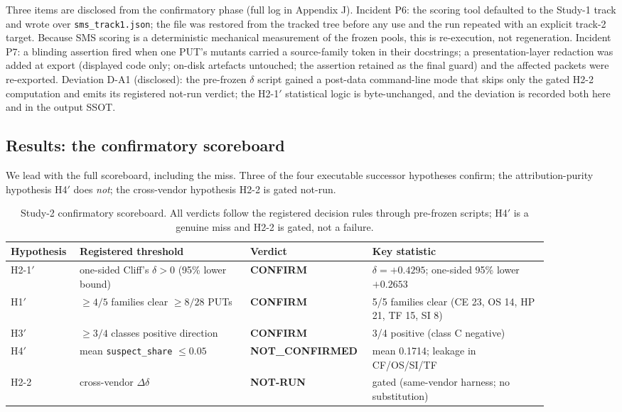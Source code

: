 \documentclass[manuscript,screen,review]{acmart}
\begin{document}
Three items are disclosed from the confirmatory phase (full log in
Appendix J). Incident P6: the scoring
tool defaulted to the Study-1 track and wrote over
\texttt{sms\_track1.json}; the file was restored from the tracked tree
before any use and the run repeated with an explicit track-2 target.
Because SMS scoring is a deterministic mechanical measurement of the
frozen pools, this is re-execution, not regeneration. Incident P7: a
blinding assertion fired when one PUT's mutants carried a source-family
token in their docstrings; a presentation-layer redaction was added at
export (displayed code only; on-disk artefacts untouched; the assertion
retained as the final guard) and the affected packets were re-exported.
Deviation D-A1 (disclosed): the pre-frozen \(\delta\) script gained a
post-data command-line mode that skips only the gated H2-2 computation
and emits its registered not-run verdict; the H2-1\('\) statistical
logic is byte-unchanged, and the deviation is recorded both here and in
the output SSOT.

\subsection{Results: the confirmatory scoreboard}\label{study2-scoreboard}

We lead with the full scoreboard, including the miss. Three of the four
executable successor hypotheses confirm; the attribution-purity
hypothesis H4\('\) does \emph{not}; the cross-vendor hypothesis H2-2 is
gated not-run.

\begin{table}[t]
\caption{Study-2 confirmatory scoreboard. All verdicts follow the
registered decision rules through pre-frozen scripts; H4\('\) is a
genuine miss and H2-2 is gated, not a failure.}
\label{tab:study2-scoreboard}
\centering
\small
\begin{tabular}{p{0.11\linewidth}p{0.30\linewidth}p{0.16\linewidth}p{0.31\linewidth}}
\toprule
Hypothesis & Registered threshold & Verdict & Key statistic \\
\midrule
H2-1\('\) & one-sided Cliff's \(\delta > 0\) (95\% lower bound) &
\textbf{CONFIRM} & \(\delta = +0.4295\); one-sided 95\% lower \(+0.2653\)
\\
H1\('\) & \(\geq 4/5\) families clear \(\geq 8/28\) PUTs &
\textbf{CONFIRM} & 5/5 families clear (CE 23, OS 14, HP 21, TF 15, SI 8)
\\
H3\('\) & \(\geq 3/4\) classes positive direction & \textbf{CONFIRM} &
3/4 positive (class C negative) \\
H4\('\) & mean \texttt{suspect\_share} \(\leq 0.05\) &
\textbf{NOT\_CONFIRMED} & mean 0.1714; leakage in CF/OS/SI/TF \\
H2-2 & cross-vendor \(\Delta\delta\) & \textbf{NOT-RUN} & gated
(same-vendor harness; no substitution) \\
\bottomrule
\end{tabular}
\normalsize
\end{table}
\end{document}
